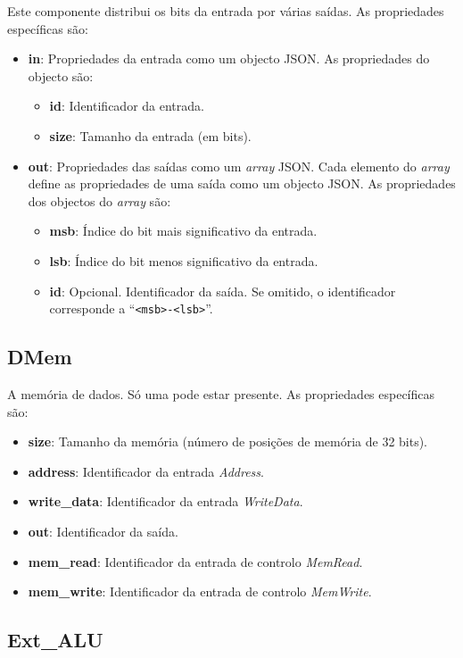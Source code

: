 \documentclass[11pt,a4paper,twoside,titlepage]{report}
\begin{document}
Este componente distribui os bits da entrada por várias saídas.
As propriedades específicas são:
\begin{itemize}
	\item \textbf{in}: Propriedades da entrada como um objecto JSON.
		As propriedades do objecto são:
		\begin{itemize}
			\item \textbf{id}: Identificador da entrada.
			\item \textbf{size}: Tamanho da entrada (em bits).
		\end{itemize}
	\item \textbf{out}: Propriedades das saídas como um \emph{array} JSON.
		Cada elemento do \emph{array} define as propriedades de uma saída como um
		objecto JSON. As propriedades dos objectos do \emph{array} são:
		\begin{itemize}
			\item \textbf{msb}: Índice do bit mais significativo da entrada.
			\item \textbf{lsb}: Índice do bit menos significativo da entrada.
			\item \textbf{id}: Opcional. Identificador da saída. Se omitido, o
				identificador corresponde a ``\verb+<msb>-<lsb>+''.
		\end{itemize}
\end{itemize}

\subsection{DMem}

A memória de dados. Só uma pode estar presente. As propriedades específicas são:
\begin{itemize}
	\item \textbf{size}: Tamanho da memória (número de posições de memória de
		32 bits).
	\item \textbf{address}: Identificador da entrada \emph{Address}.
	\item \textbf{write\_data}: Identificador da entrada \emph{WriteData}.
	\item \textbf{out}: Identificador da saída.
	\item \textbf{mem\_read}: Identificador da entrada de controlo \emph{MemRead}.
	\item \textbf{mem\_write}: Identificador da entrada de controlo \emph{MemWrite}.
\end{itemize}

\subsection{Ext\_ALU}
\end{document}
